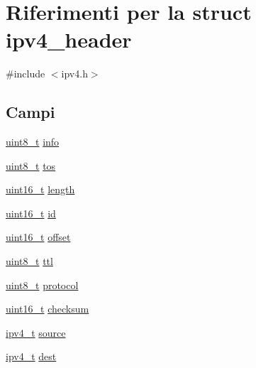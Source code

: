 \hypertarget{structipv4__header}{\section{Riferimenti per la struct ipv4\+\_\+header}
\label{structipv4__header}
}


{\ttfamily \#include $<$ipv4.\+h$>$}

\subsection*{Campi}
\begin{DoxyCompactItemize}
\item 
\hyperlink{aplus_8h_ae0430369c5a35dcdbc0bc19dcbb33a03}{uint8\+\_\+t} \hyperlink{structipv4__header_a40af269fc2efcdd3a4b85b550a376023}{info}
\item 
\hyperlink{aplus_8h_ae0430369c5a35dcdbc0bc19dcbb33a03}{uint8\+\_\+t} \hyperlink{structipv4__header_abd794754c36bf40eec3845d1b4a30715}{tos}
\item 
\hyperlink{aplus_8h_a5a8b2dc9e45a9ee81a94ef304fb62505}{uint16\+\_\+t} \hyperlink{structipv4__header_a369155b66b339effb565ee713000d695}{length}
\item 
\hyperlink{aplus_8h_a5a8b2dc9e45a9ee81a94ef304fb62505}{uint16\+\_\+t} \hyperlink{structipv4__header_a1b3ce4e0d6313af76d19bace542513a3}{id}
\item 
\hyperlink{aplus_8h_a5a8b2dc9e45a9ee81a94ef304fb62505}{uint16\+\_\+t} \hyperlink{structipv4__header_a6bae0493fa3323330e7c06c2d4ad0e4c}{offset}
\item 
\hyperlink{aplus_8h_ae0430369c5a35dcdbc0bc19dcbb33a03}{uint8\+\_\+t} \hyperlink{structipv4__header_a847be1c747cb3282ac66c766a176ecfd}{ttl}
\item 
\hyperlink{aplus_8h_ae0430369c5a35dcdbc0bc19dcbb33a03}{uint8\+\_\+t} \hyperlink{structipv4__header_ad08e98e98c2ccf2472f9740b68071979}{protocol}
\item 
\hyperlink{aplus_8h_a5a8b2dc9e45a9ee81a94ef304fb62505}{uint16\+\_\+t} \hyperlink{structipv4__header_ac6447b538451342a6f016aedd17eb9fa}{checksum}
\item 
\hyperlink{netif_8h_aea29db0d4ae23303ff7591af75c7b74a}{ipv4\+\_\+t} \hyperlink{structipv4__header_a87399a8dd7eb153478e63ce26450fe9c}{source}
\item 
\hyperlink{netif_8h_aea29db0d4ae23303ff7591af75c7b74a}{ipv4\+\_\+t} \hyperlink{structipv4__header_ad678f7696656cd04188dd3442294a793}{dest}
\end{DoxyCompactItemize}


